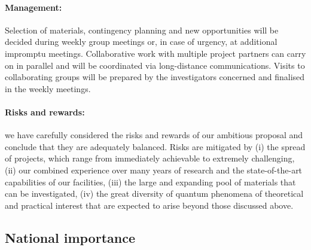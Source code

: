 \paragraph{Management:} 
Selection of materials, contingency planning and new
opportunities will be decided during weekly group meetings or,
in case of urgency, at additional impromptu meetings.  Collaborative
work with multiple project partners can carry on in parallel and will
be coordinated via long-distance communications. 
Visits to collaborating groups will be
prepared by the investigators concerned and finalised in the weekly 
meetings.

\paragraph{Risks and rewards:} we have carefully considered the risks and
rewards of our ambitious proposal and conclude that they are
adequately balanced. Risks are mitigated by (i) the spread of
projects, which range from immediately achievable to extremely
challenging, (ii) our combined experience over many years of research
and the state-of-the-art capabilities of our facilities, (iii) the large
and expanding pool of materials that can be investigated, (iv) the
great diversity of quantum phenomena of theoretical and practical
interest that are expected to arise beyond those discussed above.



\subsection*{National importance}
